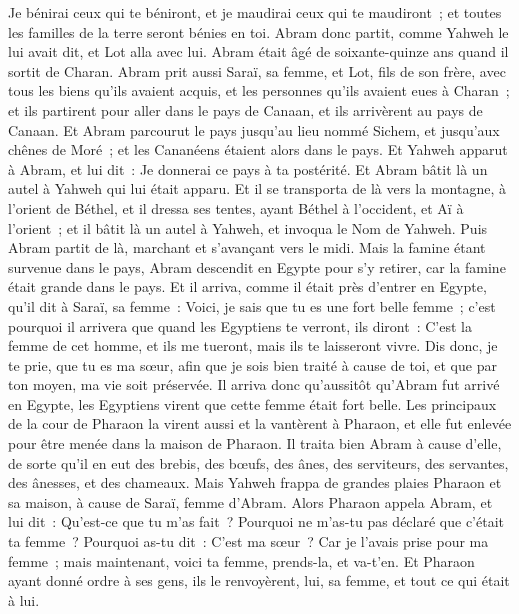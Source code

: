 \begin{multicols}{2}
Je bénirai ceux qui te béniront, et je maudirai ceux qui te maudiront~; et toutes les familles de la terre seront bénies en toi.
Abram donc partit, comme Yahweh le lui avait dit, et Lot alla avec lui. Abram était âgé de soixante-quinze ans quand il sortit de Charan.
Abram prit aussi Saraï, sa femme, et Lot, fils de son frère, avec tous les biens qu'ils avaient acquis, et les personnes qu'ils avaient eues à Charan~; et ils partirent pour aller dans le pays de Canaan, et ils arrivèrent au pays de Canaan.
Et Abram parcourut le pays jusqu'au lieu nommé Sichem, et jusqu'aux chênes de Moré~; et les Cananéens étaient alors dans le pays.
Et Yahweh apparut à Abram, et lui dit~: Je donnerai ce pays à ta postérité. Et Abram bâtit là un autel à Yahweh qui lui était apparu.
Et il se transporta de là vers la montagne, à l'orient de Béthel, et il dressa ses tentes, ayant Béthel à l'occident, et Aï à l'orient~; et il bâtit là un autel à Yahweh, et invoqua le Nom de Yahweh.
Puis Abram partit de là, marchant et s'avançant vers le midi.
Mais la famine étant survenue dans le pays, Abram descendit en Egypte pour s'y retirer, car la famine était grande dans le pays.
Et il arriva, comme il était près d'entrer en Egypte, qu'il dit à Saraï, sa femme~: Voici, je sais que tu es une fort belle femme~;
c'est pourquoi il arrivera que quand les Egyptiens te verront, ils diront~: C'est la femme de cet homme, et ils me tueront, mais ils te laisseront vivre.
Dis donc, je te prie, que tu es ma sœur, afin que je sois bien traité à cause de toi, et que par ton moyen, ma vie soit préservée.
Il arriva donc qu'aussitôt qu'Abram fut arrivé en Egypte, les Egyptiens virent que cette femme était fort belle.
Les principaux de la cour de Pharaon la virent aussi et la vantèrent à Pharaon, et elle fut enlevée pour être menée dans la maison de Pharaon.
Il traita bien Abram à cause d'elle, de sorte qu'il en eut des brebis, des bœufs, des ânes, des serviteurs, des servantes, des ânesses, et des chameaux.
Mais Yahweh frappa de grandes plaies Pharaon et sa maison, à cause de Saraï, femme d'Abram.
Alors Pharaon appela Abram, et lui dit~: Qu'est-ce que tu m'as fait~? Pourquoi ne m'as-tu pas déclaré que c'était ta femme~?
Pourquoi as-tu dit~: C'est ma sœur~? Car je l'avais prise pour ma femme~; mais maintenant, voici ta femme, prends-la, et va-t'en.
Et Pharaon ayant donné ordre à ses gens, ils le renvoyèrent, lui, sa femme, et tout ce qui était à lui.

\end{multicols}

